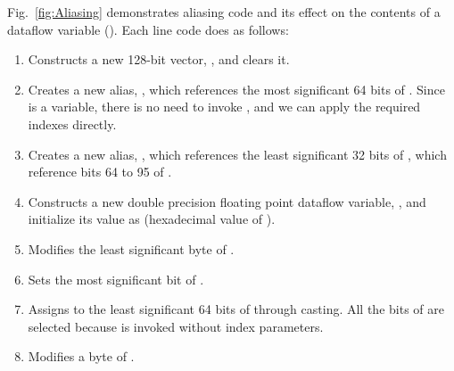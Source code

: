 Fig.~\ref{fig:Aliasing} demonstrates aliasing code and its effect on the contents of a dataflow variable (). Each line code does as follows:
\begin{enumerate}
  \item Constructs a new 128-bit vector, , and clears it.
  \item Creates a new alias, , which references the most significant 64 bits of . Since  is a  variable, there is no need to invoke , and we can apply the required indexes directly.
  \item Creates a new alias, , which references the least significant 32 bits of , which reference bits 64 to 95 of .
  \item Constructs a new double precision floating point dataflow variable, , and initialize its value as  (hexadecimal value of ).
  \item Modifies the least significant byte of .
  \item Sets the most significant bit of .
  \item Assigns  to the least significant 64 bits of  through casting. All the bits of  are selected because  is invoked without index parameters.
  \item Modifies a byte of .
  
\end{enumerate}

